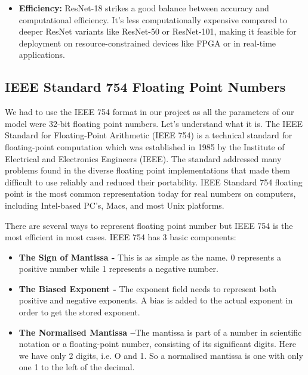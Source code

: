 \documentclass{article}
\begin{document}
\begin{enumerate}
\begin{itemize}
        \item \textbf{Efficiency:} ResNet-18 strikes a good balance between accuracy and computational efficiency. It's less computationally expensive compared to deeper ResNet variants like ResNet-50 or ResNet-101, making it feasible for deployment on resource-constrained devices like FPGA or in real-time applications.
    \end{itemize}    
\end{enumerate}

\subsection{IEEE Standard 754 Floating Point Numbers}

We had to use the IEEE 754 format in our project as all the parameters of our model were 32-bit floating point numbers. Let's understand what it is. The IEEE Standard for Floating-Point Arithmetic (IEEE 754) is a technical standard for floating-point computation which was established in 1985 by the Institute of Electrical and Electronics Engineers (IEEE). The standard addressed many problems found in the diverse floating point implementations that made them difficult to use reliably and reduced their portability. IEEE Standard 754 floating point is the most common representation today for real numbers on computers, including Intel-based PC’s, Macs, and most Unix platforms.

There are several ways to represent floating point number but IEEE 754 is the most efficient in most cases. IEEE 754 has 3 basic components:

\begin{itemize}
    \item \textbf{The Sign of Mantissa - }This is as simple as the name. 0 represents a positive number while 1 represents a negative number.

    \item \textbf{The Biased Exponent - }The exponent field needs to represent both positive and negative exponents. A bias is added to the actual exponent in order to get the stored exponent.

    \item \textbf{The Normalised Mantissa –}The mantissa is part of a number in scientific notation or a floating-point number, consisting of its significant digits. Here we have only 2 digits, i.e. O and 1. So a normalised mantissa is one with only one 1 to the left of the decimal.
\end{itemize}
\end{document}
